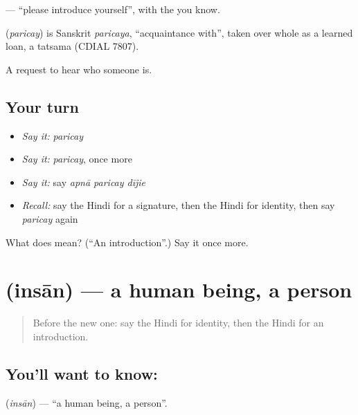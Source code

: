\textbf{  } — \textquotedblleft{}please introduce yourself\textquotedblright{}, with the \textbf{} you know.

\begin{cousinweb}
\textbf{} (\emph{paricay}) is Sanskrit \emph{paricaya}, \textquotedblleft{}acquaintance with\textquotedblright{}, taken over whole as a learned loan, a tatsama (CDIAL 7807).
\end{cousinweb}

\begin{grammarlens}[title={What you've built}]
A request to hear who someone is.
\end{grammarlens}

\subsection*{Your turn}
\begin{itemize}
\raggedright
  \item \emph{Say it:} \emph{paricay}
  \item \emph{Say it:} \emph{paricay}, once more
  \item \emph{Say it:} say \emph{apnā paricay dījie}
  \item \emph{Recall:} say the Hindi for a signature, then the Hindi for identity, then say \emph{paricay} again
\end{itemize}

\begin{tcolorbox}[breakable,colback=teal!4,colframe=teal!35!black,title={Before you move on}]
What does  mean? (\textquotedblleft{}An introduction\textquotedblright{}.) Say it once more.
\end{tcolorbox}
\section[\texorpdfstring{\hi{इंसान} (insān)}{इंसान (insān)}]{ (insān) — a human being, a person}

\label{lesson:HI-C120-insan}



\begin{quote}
Before the new one: say the Hindi for identity, then the Hindi for an introduction.
\end{quote}

\subsection*{You'll want to know: }
\textbf{} (\emph{insān}) — \textquotedblleft{}a human being, a person\textquotedblright{}.

